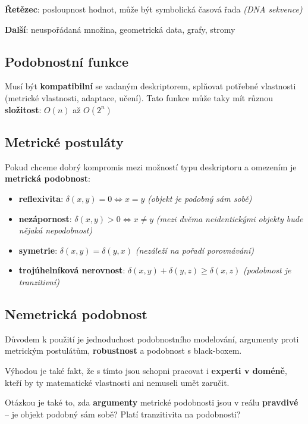 \textbf{Řetězec}: posloupnost hodnot, může být symbolická časová řada \textit{(DNA sekvence)}

\textbf{Další}: neuspořádaná množina, geometrická data, grafy, stromy

\subsection{Podobnostní funkce}

Musí být \textbf{kompatibilní} se zadaným deskriptorem, splňovat potřebné vlastnosti (metrické vlastnosti, adaptace, učení). Tato funkce může taky mít různou \textbf{složitost}: $O(n)$ až $O(2^n)$

\subsection{Metrické postuláty}

Pokud chceme dobrý kompromis mezi možností typu deskriptoru a omezením je \textbf{metrická podobnost}:

\vspace{12pt}

\begin{itemize}
    \item \textbf{reflexivita}: $\delta(x,y) = 0 \iff x = y$ \textit{(objekt je podobný sám sobě)}
    \item \textbf{nezápornost}: $\delta(x,y) > 0 \iff x \neq y$ \textit{(mezi dvěma neidentickými objekty bude nějaká nepodobnost)}
    \item \textbf{symetrie}: $\delta(x,y) = \delta(y,x)$ \textit{(nezáleží na pořadí porovnávání)}
    \item \textbf{trojúhelníková nerovnost}: $\delta(x,y) + \delta(y,z) \geq \delta(x,z)$ \textit{(podobnost je tranzitivní)}
\end{itemize}

\subsection{Nemetrická podobnost}

Důvodem k použití je jednoduchost podobnostního modelování, argumenty proti metrickým postulátům, \textbf{robustnost} a podobnost s black-boxem.

Výhodou je také fakt, že s tímto jsou schopni pracovat i \textbf{experti v doméně}, kteří by ty matematické vlastnosti ani nemuseli umět zaručit.

Otázkou je také to, zda \textbf{argumenty} metrické podobnosti jsou v reálu \textbf{pravdivé} -- je objekt podobný sám sobě? Platí tranzitivita na podobnosti?

